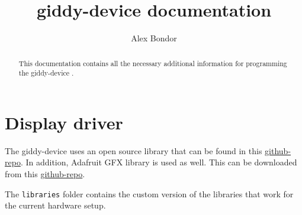 \documentclass{article}
\newcommand{\device}{giddy-device }
\begin{document}
\title{\device documentation}
\author{Alex Bondor}

\maketitle
\thispagestyle{empty}

\newpage

\begin{abstract}
This documentation contains all the necessary additional information for programming the \device.
\end{abstract}

\section{Display driver}
The \device uses an open source library that can be found in this  \href{https://github.com/sumotoy/TFT_ILI9163C}{github-repo}. In addition, Adafruit GFX library is used as well. This can be downloaded from this \href{https://github.com/adafruit/Adafruit-GFX-Library.git}{github-repo}.

The \lstinline|libraries| folder contains the custom version of the libraries that work for the current hardware setup.
\end{document}
